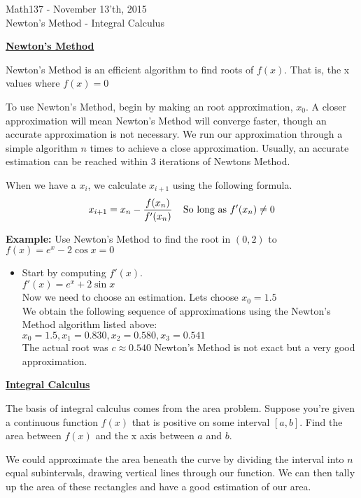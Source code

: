 \documentclass{letter}
\begin{document}
	\begin{center}
		\LARGE Math137 - November 13'th, 2015\\
		\large Newton's Method - Integral Calculus
	\end{center}
	\vspace{0.25 in}
	\underline{\textbf{Newton's Method}}
	
	Newton's Method is an efficient algorithm to find roots of $f(x)$. That is, the x values where $f(x) = 0$
	
	To use Newton's Method, begin by making an root approximation, $x_0$. A closer approximation will mean Newton's Method will converge faster, though an accurate approximation is not necessary. We run our approximation through a simple algorithm $n$ times to achieve a close approximation. Usually, an accurate estimation can be reached within 3 iterations of Newtons Method.
	
	When we have a $x_i$, we calculate $x_{i+1}$ using the following formula.
	\[x_{i+1} = x_n - \frac{f(x_n)}{f'(x_n)} \text{\;\;\;\;So long as $f'(x_n) \neq 0$}\] 
	
	\textbf{Example:} Use Newton's Method to find the root in $(0, 2)$ to $f(x) = e^x - 2\cos x = 0$
	\begin{itemize}
		\item[ ] Start by computing $f'(x)$.\\
		
		$f'(x) = e^x + 2 \sin x$\\
		
		Now we need to choose an estimation. Lets choose $x_0 = 1.5$\\
		
		We obtain the following sequence of approximations using the Newton's Method algorithm listed above:\\
		
		$x_0 = 1.5, x_1 = 0.830, x_2 = 0.580, x_3 = 0.541$\\
		
		The actual root was $c \approx 0.540$ Newton's Method is not exact but a very good approximation.
	\end{itemize}
	
	\underline{\textbf{Integral Calculus}}
	
	The basis of integral calculus comes from the area problem. Suppose you're given a continuous function $f(x)$ that is positive on some interval $[a, b]$. Find the area between $f(x)$ and the x axis between $a$ and $b$.
	
	We could approximate the area beneath the curve by dividing the interval into $n$ equal subintervals, drawing vertical lines through our function. We can then tally up the area of these rectangles and have a good estimation of our area.
	
\end{document}
